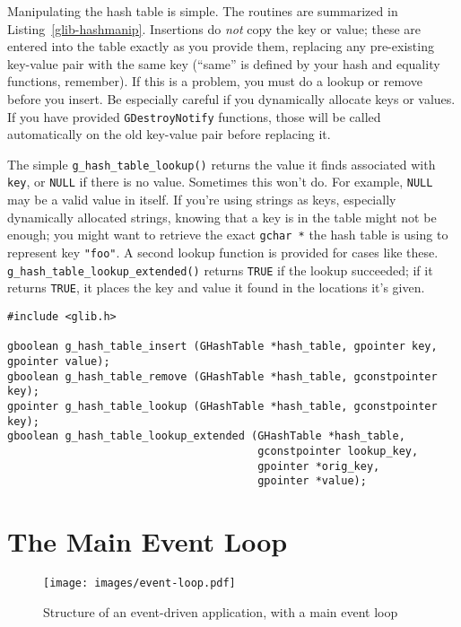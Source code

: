 Manipulating the hash table is simple. The routines are summarized in Listing~\ref{glib-hashmanip}. Insertions do \emph{not} copy the key or value; these are entered into the table exactly as you provide them, replacing any pre-existing key-value pair with the same key (``same'' is defined by your hash and equality functions, remember). If this is a problem, you must do a lookup or remove before you insert. Be especially careful if you dynamically allocate keys or values. If you have provided \lstinline{GDestroyNotify} functions, those will be called automatically on the old key-value pair before replacing it.

The simple \lstinline{g_hash_table_lookup()} returns the value it finds associated with \lstinline{key}, or \lstinline{NULL} if there is no value. Sometimes this won't do. For example, \lstinline{NULL} may be a valid value in itself. If you're using strings as keys, especially dynamically allocated strings, knowing that a key is in the table might not be enough; you might want to retrieve the exact \lstinline{gchar *} the hash table is using to represent key \lstinline{"foo"}. A second lookup function is provided for cases like these. \lstinline{g_hash_table_lookup_extended()} returns \lstinline{TRUE} if the lookup succeeded; if it returns \lstinline{TRUE}, it places the key and value it found in the locations it's given.

\begin{lstlisting}[float, caption={Manipulating a \lstinline{GHashTable}}, label=glib-hashmanip]
#include <glib.h>

gboolean g_hash_table_insert (GHashTable *hash_table, gpointer key, gpointer value);
gboolean g_hash_table_remove (GHashTable *hash_table, gconstpointer key);
gpointer g_hash_table_lookup (GHashTable *hash_table, gconstpointer key);
gboolean g_hash_table_lookup_extended (GHashTable *hash_table,
                                       gconstpointer lookup_key,
                                       gpointer *orig_key,
                                       gpointer *value);
\end{lstlisting}

\section{The Main Event Loop}

\begin{figure}
  \begin{center}
    \texttt{[image: images/event-loop.pdf]}
    \caption{Structure of an event-driven application, with a main event loop}
    \label{glib-event-loop}
  \end{center}
\end{figure}

